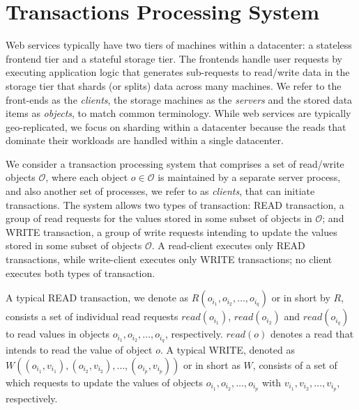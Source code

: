 \section{Transactions Processing System}
\label{sec:prelim}
Web services typically have two tiers of machines within a datacenter: a stateless
frontend tier and a stateful storage tier.
The frontends handle user requests by executing application logic that generates
sub-requests to read/write data in the storage tier that shards (or splits) data across many machines.
We refer to the front-ends as the \textit{clients}, the storage machines as
the \textit{servers} and the stored data items as \textit{objects}, to match common terminology.
While web services are typically geo-replicated, we focus on sharding within a datacenter because the reads that dominate their workloads are handled within a single datacenter.

We consider a transaction processing system that comprises a set of read/write objects $\mathcal{O}$,
 where each object 
$o \in \mathcal{O}$ is maintained by a separate server process,
and also another set of processes, we refer to as \emph{clients}, that can initiate transactions.
 The system allows two types of transaction: {\sc READ} transaction, a group of read requests for the values stored in some subset of objects in $\mathcal{O}$; and {\sc WRITE} transaction, a group of write requests intending to update the values stored in some subset of objects  $\mathcal{O}$.
 A read-client executes only READ transactions, while write-client executes only WRITE transactions; no client executes both types of transaction.

A typical READ transaction, we denote as $\textit{R}(o_{i_1}, o_{i_2}, \ldots, o_{i_q})$ or in short by $R$, consists a set of individual read requests
  $read(o_{i_1})$,  $read(o_{i_2})$ and  $read(o_{i_q})$ to read values in objects $o_{i_1}, o_{i_2}, \ldots, o_{i_q}$, respectively.
   $read(o)$ denotes a read that intends to read the value of object $o$.
 A typical WRITE, denoted as   
 $\textit{W}((o_{i_1}, v_{i_1}), (o_{i_2}, v_{i_2}), \ldots, (o_{i_p}, v_{i_p}))$ or in short as $W$, consists of a set of which requests to update the values of objects $o_{i_1}, o_{i_2}, \ldots, o_{i_p}$ with  $v_{i_1}, v_{i_2}, \ldots, v_{i_p}$, respectively.
  

